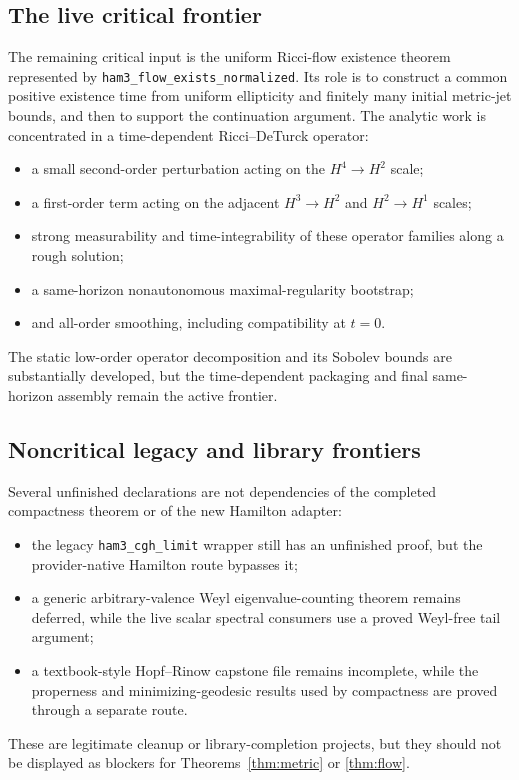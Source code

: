\documentclass[11pt]{article}
\theoremstyle{plain}
\theoremstyle{definition}
\theoremstyle{remark}
\newcommand{\leanref}[1]{\nolinkurl{#1}}
\begin{document}
\subsection{The live critical frontier}

The remaining critical input is the uniform Ricci-flow existence theorem
represented by \leanref{ham3_flow_exists_normalized}.
Its role is to construct a common positive existence time from uniform
ellipticity and finitely many initial metric-jet bounds, and then to support
the continuation argument.  The analytic work is concentrated in a
time-dependent Ricci--DeTurck operator:
\begin{itemize}[leftmargin=2em]
  \item a small second-order perturbation acting on the \(H^4\to H^2\)
  scale;
  \item a first-order term acting on the adjacent
  \(H^3\to H^2\) and \(H^2\to H^1\) scales;
  \item strong measurability and time-integrability of these operator
  families along a rough solution;
  \item a same-horizon nonautonomous maximal-regularity bootstrap;
  \item and all-order smoothing, including compatibility at \(t=0\).
\end{itemize}
The static low-order operator decomposition and its Sobolev bounds are
substantially developed, but the time-dependent packaging and final
same-horizon assembly remain the active frontier.

\subsection{Noncritical legacy and library frontiers}

Several unfinished declarations are not dependencies of the completed
compactness theorem or of the new Hamilton adapter:
\begin{itemize}[leftmargin=2em]
  \item the legacy \leanref{ham3_cgh_limit} wrapper still has an unfinished
  proof, but the provider-native Hamilton route bypasses it;
  \item a generic arbitrary-valence Weyl eigenvalue-counting theorem remains
  deferred, while the live scalar spectral consumers use a proved
  Weyl-free tail argument;
  \item a textbook-style Hopf--Rinow capstone file remains incomplete, while
  the properness and minimizing-geodesic results used by compactness are
  proved through a separate route.
\end{itemize}
These are legitimate cleanup or library-completion projects, but they should
not be displayed as blockers for Theorems~\ref{thm:metric} or
\ref{thm:flow}.
\end{document}
